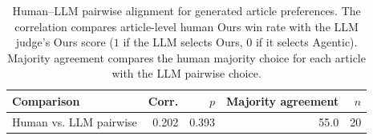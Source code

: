 \begin{table}[t]
\centering
\small
\setlength{\tabcolsep}{4pt}
\begin{tabular}{lrrrr}
\toprule
Comparison & Corr. & $p$ & Majority agreement & $n$ \\
\midrule
Human vs. LLM pairwise & 0.202 & 0.393 & 55.0 & 20 \\
\bottomrule
\end{tabular}
\caption{Human--LLM pairwise alignment for generated article preferences. The correlation compares article-level human Ours win rate with the LLM judge's Ours score ($1$ if the LLM selects Ours, $0$ if it selects Agentic). Majority agreement compares the human majority choice for each article with the LLM pairwise choice.}
\label{tab:human_llm_pairwise_alignment}
\end{table}
